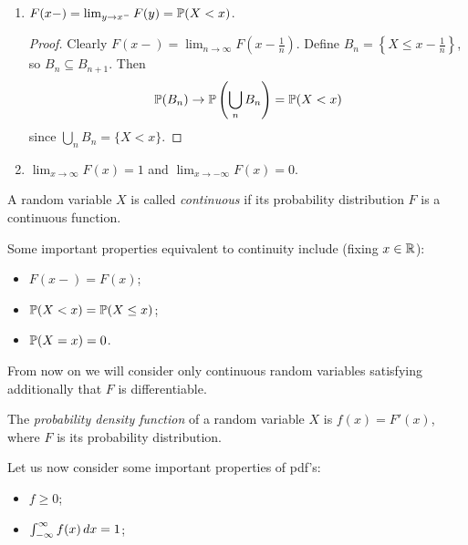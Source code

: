 \documentclass{../../template/note}
\begin{document}
    \begin{enumerate}[resume,label=\protect\circled{\arabic*}]
        \item \(F(x-) = \lim_{y \to x^-} F(y) = \mathbb P(X < x)\).
        \begin{proof}
            Clearly \(F(x-) = \lim_{n \to \infty} F\left(x - \frac 1 n \right)\). Define \(B_n = \left\{X \leq x - \frac 1 n \right\}\), so \(B_n \subseteq B_{n+1}\). Then
            \begin{align*}
                \mathbb P(B_n) \to \mathbb P\left(\bigcup_n B_n\right) = \mathbb P(X < x)
            \end{align*}
            since \(\bigcup_n B_n = \{X < x\}\).            
        \end{proof}

        \item \(\lim_{x \to \infty} F(x) = 1\) and \(\lim_{x \to -\infty} F(x) = 0\).
    \end{enumerate}
    
    \begin{definition}
        A random variable \(X\) is called \emph{continuous} if its probability distribution \(F\) is a continuous function.
    \end{definition}
    
    Some important properties equivalent to continuity include (fixing \(x \in \mathbb R\)):
    \begin{itemize}
        \item \(F(x-) = F(x)\);
        \item \(\mathbb P(X < x) = \mathbb P(X \leq x)\);
        \item \(\mathbb P(X = x) = 0\).
    \end{itemize}
    
    From now on we will consider only continuous random variables satisfying additionally that \(F\) is differentiable.

    \begin{definition}
        The \emph{probability density function} of a random variable \(X\) is \(f(x) = F'(x)\), where \(F\) is its probability distribution.
    \end{definition}
    
    Let us now consider some important properties of pdf's:
    \begin{itemize}
        \item \(f \geq 0\);
        \item \(\int_{-\infty}^\infty f(x) \,d{x} = 1\);
    \end{itemize}
    
\end{document}
